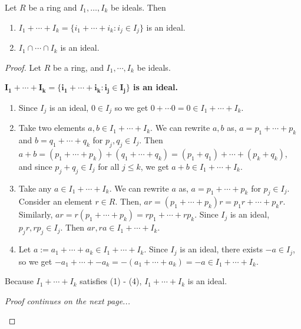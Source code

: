 \documentclass [12pt] {article}
\newenvironment{theorem}[1]{\begin{tcolorbox}[title={Theorem #1},colback=green!5!white,colframe=black!75!green]}{\end{tcolorbox}}
\renewcommand{\it}[1]{\textit{{#1}}}
\renewcommand{\bf}[1]{\textbf{{#1}}}
\begin{document}
\begin{theorem}{}
    Let $R$ be a ring and $I_1, \ldots, I_k$ be ideals. Then
    \begin{enumerate}[label=(\arabic*)]
        \item $I_1 + \cdots + I_k = \{ i_1 + \cdots + i_k : i_j \in I_j \}$ is an ideal.
        \item $I_1 \cap \cdots \cap I_k$ is an ideal.
    \end{enumerate}
\end{theorem}
\begin{proof}
    Let $R$ be a ring, and $I_1, \cdots, I_k$ be ideals.
    \vspace{0.5em}

    \bf{$\bm{I_1 + \cdots + I_k = \{ i_1 + \cdots + i_k : i_j \in I_j \}}$ is an ideal.}
    \begin{enumerate}[label=(\arabic*), itemsep=0em]
        \item Since $I_j$ is an ideal, $0 \in I_j$ so we get
            $0 + \cdots 0 = 0 \in I_1 + \cdots + I_k$.
        \item Take two elements $a, b \in I_1 + \cdots + I_k$. We can rewrite $a, b$ as,
            $a = p_1 + \cdots + p_k$ and $b = q_1 + \cdots + q_k$ for $p_j, q_j \in I_j$. Then
            $
            a + b 
            = (p_1 + \cdots + p_k) + (q_1 + \cdots + q_k)
            = (p_1 + q_1) + \cdots + (p_k + q_k)
            $, and since $p_j + q_j \in I_j$ for all $j \leq k$, we get 
            $a + b \in I_1 + \cdots + I_k$.
        \item Take any $a \in I_1 + \cdots + I_k$. We can
            rewrite $a$ as, $a = p_1 + \cdots + p_k$ for $p_j \in I_j$. Consider an element $r \in R$. 
            Then, $ar = (p_1 + \cdots + p_k) r = p_1 r + \cdots + p_k r$. Similarly,
            $ar = r (p_1 + \cdots + p_k) = r p_1 + \cdots + r p_k$. Since $I_j$ is an ideal, 
            $p_j r, r p_j \in I_j$. Then $ar, ra \in I_1 + \cdots + I_k$.
        \item Let $a := a_1 + \cdots + a_k \in I_1 + \cdots + I_k$.
            Since $I_j$ is an ideal, there exists $-a \in I_j$, so we get 
            $-a_1 + \cdots + -a_k  = -(a_1 + \cdots + a_k)  = -a \in I_1 + \cdots + I_k$.
    \end{enumerate}
    Because $I_1 + \cdots + I_k$ satisfies (1) - (4), $I_1 + \cdots + I_k$ is an ideal.
    \begin{center}
        \small{\it{Proof continues on the next page...}}
    \end{center}

\end{proof}
\end{document}
